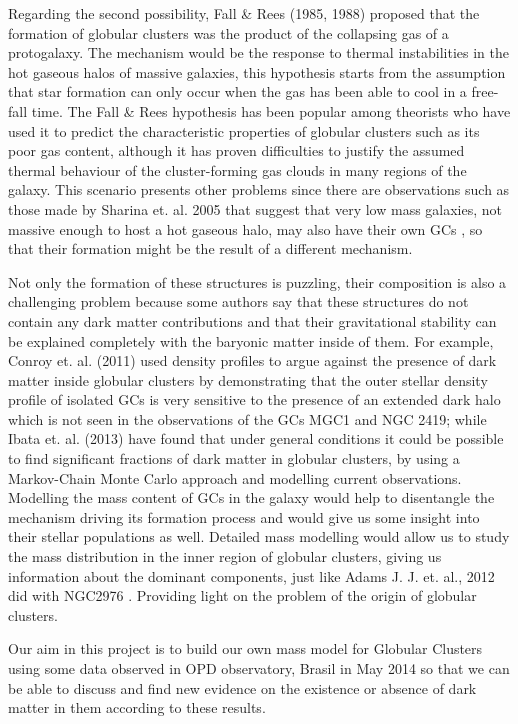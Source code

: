 Regarding the second possibility, Fall \& Rees (1985, 1988)\cite{13} proposed that the formation of globular clusters was the product of the collapsing gas of a protogalaxy. The mechanism would be the response to thermal instabilities in the hot gaseous halos of massive galaxies, this hypothesis starts from the assumption that star formation can only occur when the gas has been able to cool in a free-fall time. The Fall \& Rees hypothesis has been popular among theorists who have used it to predict the characteristic properties of globular clusters such as its poor gas content, although it has proven difficulties to justify the assumed thermal behaviour of the cluster-forming gas clouds in many regions of the galaxy. This scenario presents other problems since there are observations such as those made by Sharina et. al. 2005 \cite{10} that suggest that very low mass galaxies, not massive enough to host a hot gaseous halo, may also have their own GCs , so that their formation might be the result of a different mechanism.

Not only the formation of these structures is puzzling, their composition is also a challenging problem because some authors say that these structures do not contain any dark matter contributions and that their gravitational stability can be explained completely with the baryonic matter inside of them. For example, Conroy et. al. (2011) \cite{14} used density profiles to argue against the presence of dark matter inside globular clusters by demonstrating that the outer stellar density profile of isolated GCs is
very sensitive to the presence of an extended dark halo which is not seen in the observations of the GCs MGC1 and NGC 2419; while Ibata et. al. (2013) \cite{5} have found that under general conditions it could be possible to find significant fractions of dark matter in globular clusters, by using a Markov-Chain Monte Carlo approach and modelling current observations. Modelling the mass content of GCs in the galaxy would help to disentangle the mechanism driving its formation process and would give us some insight into their stellar populations as well. Detailed mass modelling would allow us to study the mass distribution in the inner region of globular clusters, giving us information about the dominant components, just like Adams J. J. et. al., 2012 did with NGC2976 \cite{6}. Providing light on the problem of the origin of globular clusters.

Our aim in this project is to build our own mass model for Globular Clusters using some data observed in OPD observatory, Brasil in May 2014 so that we can be able to discuss and find new evidence on the existence or absence of dark matter in them according to these results. 

